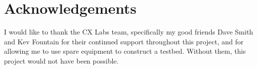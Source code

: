 \section*{Acknowledgements}
I would like to thank the CX Labs team, specifically my good friends Dave Smith and Kev Fountain for their continued support throughout this project, and for allowing me to use spare equipment to construct a testbed. Without them, this project would not have been possible.